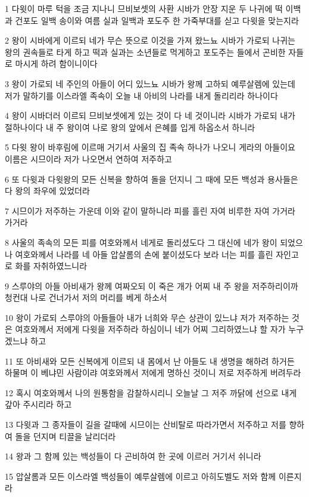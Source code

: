 \par 1 다윗이 마루 턱을 조금 지나니 므비보셋의 사환 시바가 안장 지운 두 나귀에 떡 이백과 건포도 일백 송이와 여름 실과 일백과 포도주 한 가죽부대를 싣고 다윗을 맞는지라
\par 2 왕이 시바에게 이르되 네가 무슨 뜻으로 이것을 가져 왔느뇨 시바가 가로되 나귀는 왕의 권속들로 타게 하고 떡과 실과는 소년들로 먹게하고 포도주는 들에서 곤비한 자들로 마시게 하려 함이니이다
\par 3 왕이 가로되 네 주인의 아들이 어디 있느뇨 시바가 왕께 고하되 예루살렘에 있는데 저가 말하기를 이스라엘 족속이 오늘 내 아비의 나라를 내게 돌리리라 하나이다
\par 4 왕이 시바더러 이르되 므비보셋에게 있는 것이 다 네 것이니라 시바가 가로되 내가 절하나이다 내 주 왕이여 나로 왕의 앞에서 은혜를 입게 하옵소서 하니라
\par 5 다윗 왕이 바후림에 이르매 거기서 사울의 집 족속 하나가 나오니 게라의 아들이요 이름은 시므이라 저가 나오면서 연하여 저주하고
\par 6 또 다윗과 다윗왕의 모든 신복을 향하여 돌을 던지니 그 때에 모든 백성과 용사들은 다 왕의 좌우에 있었더라
\par 7 시므이가 저주하는 가운데 이와 같이 말하니라 피를 흘린 자여 비루한 자여 가거라 가거라
\par 8 사울의 족속의 모든 피를 여호와께서 네게로 돌리셨도다 그 대신에 네가 왕이 되었으나 여호와께서 나라를 네 아들 압살롬의 손에 붙이셨도다 보라 너는 피를 흘린 자인고로 화를 자취하였느니라
\par 9 스루야의 아들 아비새가 왕께 여짜오되 이 죽은 개가 어찌 내 주 왕을 저주하리이까 청컨대 나로 건너가서 저의 머리를 베게 하소서
\par 10 왕이 가로되 스루야의 아들들아 내가 너희와 무슨 상관이 있느냐 저가 저주하는 것은 여호와께서 저에게 다윗을 저주하라 하심이니 네가 어찌 그리하였느냐 할 자가 누구겠느냐 하고
\par 11 또 아비새와 모든 신복에게 이르되 내 몸에서 난 아들도 내 생명을 해하려 하거든 하물며 이 베냐민 사람이랴 여호와께서 저에게 명하신 것이니 저로 저주하게 버려두라
\par 12 혹시 여호와께서 나의 원통함을 감찰하시리니 오늘날 그 저주 까닭에 선으로 내게 갚아 주시리라 하고
\par 13 다윗과 그 종자들이 길을 갈때에 시므이는 산비탈로 따라가면서 저주하고 저를 향하여 돌을 던지며 티끌을 날리더라
\par 14 왕과 그 함께 있는 백성들이 다 곤비하여 한 곳에 이르러 거기서 쉬니라
\par 15 압살롬과 모든 이스라엘 백성들이 예루살렘에 이르고 아히도벨도 저와 함께 이른지라
